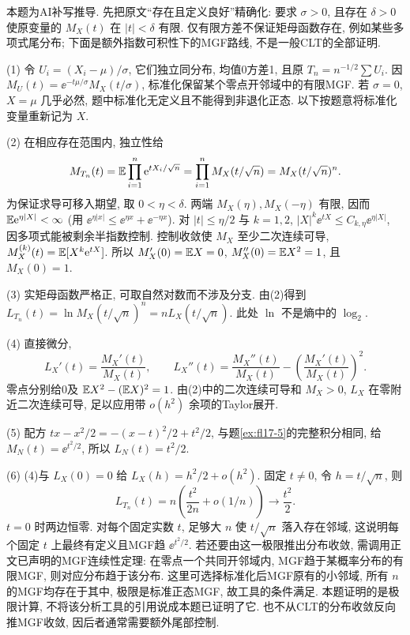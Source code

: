 \begin{solution}
本题为AI补写推导. 先把原文``存在且定义良好''精确化: 要求 $\sigma>0$, 且存在 $\delta>0$ 使原变量的 $M_X(t)$ 在 $|t|<\delta$ 有限. 仅有限方差不保证矩母函数存在, 例如某些多项式尾分布; 下面是额外指数可积性下的MGF路线, 不是一般CLT的全部证明.

(1)\label{sol:flp-I-1} 令 $U_i=(X_i-\mu)/\sigma$, 它们独立同分布, 均值0方差1, 且原 $T_n=n^{-1/2}\sum U_i$. 因 $M_U(t)=\ee^{-t\mu/\sigma}M_X(t/\sigma)$, 标准化保留某个零点开邻域中的有限MGF. 若 $\sigma=0$, $X=\mu$ 几乎必然, 题中标准化无定义且不能得到非退化正态. 以下按题意将标准化变量重新记为 $X$.

(2)\label{sol:flp-I-2} 在相应存在范围内, 独立性给
\[M_{T_n}(t)=\mathbb E\prod_{i=1}^n\mathrm e^{tX_i/\sqrt n}
=\prod_{i=1}^nM_X(t/\sqrt n)=M_X(t/\sqrt n)^n.\]
为保证求导可移入期望, 取 $0<\eta<\delta$. 两端 $M_X(\eta),M_X(-\eta)$ 有限, 因而 $\mathbb E\mathrm e^{\eta|X|}<\infty$ (用 $\ee^{\eta|x|}\leq\ee^{\eta x}+\ee^{-\eta x}$). 对 $|t|\leq\eta/2$ 与 $k=1,2$, $|X|^k\ee^{tX}\leq C_{k,\eta}\ee^{\eta|X|}$, 因多项式能被剩余半指数控制. 控制收敛使 $M_X$ 至少二次连续可导, $M_X^{(k)}(t)=\mathbb E[X^k\mathrm e^{tX}]$. 所以 $M_X'(0)=\mathbb E X=0$, $M_X''(0)=\mathbb E X^2=1$, 且 $M_X(0)=1$.

(3)\label{sol:flp-I-3} 实矩母函数严格正, 可取自然对数而不涉及分支. 由(2)得到 $L_{T_n}(t)=\ln M_X(t/\sqrt n)^n=nL_X(t/\sqrt n)$. 此处 $\ln$ 不是熵中的 $\log_2$.

(4)\label{sol:flp-I-4} 直接微分,
\[L_X'(t)=\frac{M_X'(t)}{M_X(t)},\qquad
L_X''(t)=\frac{M_X''(t)}{M_X(t)}-\left(\frac{M_X'(t)}{M_X(t)}\right)^2.\]
零点分别给0及 $\mathbb E X^2-(\mathbb E X)^2=1$. 由(2)中的二次连续可导和 $M_X>0$, $L_X$ 在零附近二次连续可导, 足以应用带 $o(h^2)$ 余项的Taylor展开.

(5)\label{sol:flp-I-5} 配方 $tx-x^2/2=-(x-t)^2/2+t^2/2$, 与题\ref{ex:fl17-5}的完整积分相同, 给 $M_N(t)=\ee^{t^2/2}$, 所以 $L_N(t)=t^2/2$.

(6)\label{sol:flp-I-6} (4)与 $L_X(0)=0$ 给 $L_X(h)=h^2/2+o(h^2)$. 固定 $t\ne0$, 令 $h=t/\sqrt n$, 则
\[L_{T_n}(t)=n\left(\frac{t^2}{2n}+o(1/n)\right)\longrightarrow\frac{t^2}{2}.
\]
$t=0$ 时两边恒零. 对每个固定实数 $t$, 足够大 $n$ 使 $t/\sqrt n$ 落入存在邻域, 这说明每个固定 $t$ 上最终有定义且MGF趋 $\ee^{t^2/2}$. 若还要由这一极限推出分布收敛, 需调用正文已声明的MGF连续性定理: 在零点一个共同开邻域内, MGF趋于某概率分布的有限MGF, 则对应分布趋于该分布. 这里可选择标准化后MGF原有的小邻域, 所有 $n$ 的MGF均存在于其中, 极限是标准正态MGF, 故工具的条件满足. 本题证明的是极限计算, 不将该分析工具的引用说成本题已证明了它. 也不从CLT的分布收敛反向推MGF收敛, 因后者通常需要额外尾部控制.
\end{solution}

